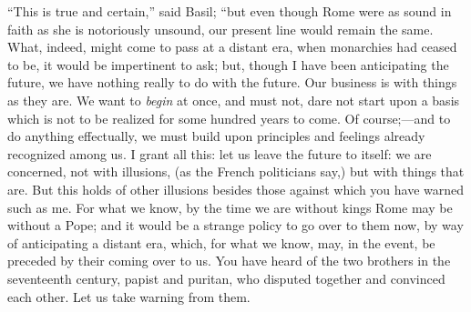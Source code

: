 ``This is true and certain,'' said Basil; ``but even
though Rome were as sound in faith as she is notoriously unsound, our
present line would remain the same. What, indeed, might come to pass
at a distant era, when monarchies had ceased to be, it would be
impertinent to ask; but, though I have been anticipating the future,
we have nothing really to do with the future. Our business is with
things as they are. We want to \emph{begin} at once, and must not,
dare not start upon a basis which is not to be realized for some
hundred years to come. Of course;—and to do anything effectually, we
must build upon principles and feelings already recognized among us. I
grant all this: let us leave the future to itself: we are concerned,
not with illusions, (as the French politicians say,) but with things
that are. But this holds of other illusions besides those against
which you have warned such as me. For what we know, by the time we are
without kings Rome may be without a Pope; and it would be a strange
policy to go over to them now, by way of anticipating a distant era,
which, for what we know, may, in the event, be preceded by their
coming over to us. You have heard of the two brothers in the
seventeenth century, papist and puritan, who disputed together and
convinced each other. Let us take warning from them.

